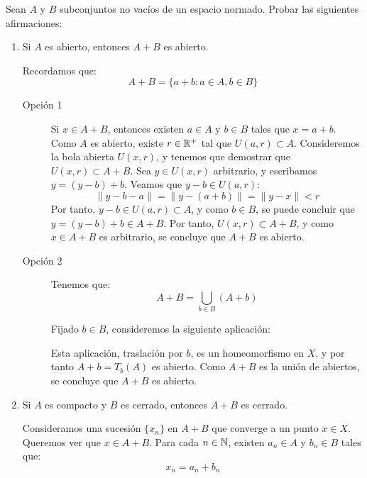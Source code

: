 \begin{ejercicio}
Sean $A$ y $B$ subconjuntos no vacíos de un espacio normado. Probar las siguientes afirmaciones:
\begin{enumerate}[label={\alph*)}]
    \item Si $A$ es abierto, entonces $A + B$ es abierto.
    
    Recordamos que:
    \begin{equation*}
        A + B = \{a + b : a \in A, b \in B\}
    \end{equation*}

    \begin{description}
        \item[Opción 1] Si $x \in A + B$, entonces existen $a \in A$ y $b \in B$ tales que $x = a + b$. Como $A$ es abierto, existe $r \in \mathbb{R}^+$ tal que $U(a, r) \subset A$. Consideremos la bola abierta $U(x, r)$, y tenemos que demostrar que $U(x, r) \subset A + B$. Sea $y \in U(x, r)$ arbitrario, y escribamos $y = (y -b) + b$. Veamos que $y - b \in U(a, r)$:
        \begin{equation*}
            \|y - b - a\| = \|y - (a + b)\| = \|y - x\| < r
        \end{equation*}
        Por tanto, $y - b \in U(a, r) \subset A$, y como $b \in B$, se puede concluir que $y = (y - b) + b \in A + B$. Por tanto, $U(x, r) \subset A + B$, y como $x \in A + B$ es arbitrario, se concluye que $A + B$ es abierto.
        
        \item[Opción 2] Tenemos que:
        \begin{equation*}
            A + B = \bigcup_{b \in B} (A + b)
        \end{equation*}

        Fijado $b \in B$, consideremos la siguiente aplicación:

        Esta aplicación, traslación por $b$, es un homeomorfismo en $X$, y por tanto $A + b=T_b(A)$ es abierto. Como $A + B$ es la unión de abiertos, se concluye que $A + B$ es abierto.
    \end{description}
    \item Si $A$ es compacto y $B$ es cerrado, entonces $A + B$ es cerrado.
    
    Consideramos una sucesión $\{x_n\}$ en $A + B$ que converge a un punto $x \in X$. Queremos ver que $x \in A + B$. Para cada $n \in \mathbb{N}$, existen $a_n \in A$ y $b_n \in B$ tales que:
    \begin{equation*}
        x_n = a_n + b_n
    \end{equation*}


\end{enumerate}
\end{ejercicio}
